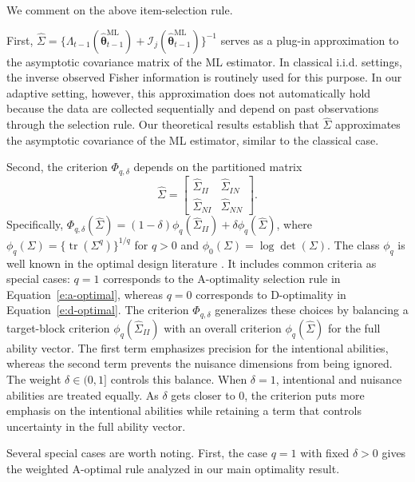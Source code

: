 \documentclass[12pt]{article}
\newcommand{\bftheta}{\boldsymbol{\theta}}
\begin{document}
We comment on the above item-selection rule.

First, \(\hat{\Sigma} =\big\{\Lambda_{t-1}(\hat{\bftheta}_{t-1}^{\mathrm{ML}})+\mathcal{I}_j(\hat{\bftheta}_{t-1}^{\mathrm{ML}})\big\}^{-1}\) serves as a plug-in approximation to the asymptotic covariance matrix of the ML estimator. In classical i.i.d. settings, the inverse observed Fisher information is routinely used for this purpose. In our adaptive setting, however, this approximation does not automatically hold because the data are collected sequentially and depend on past observations through the selection rule. Our theoretical results establish that \(\hat{\Sigma}\) approximates the asymptotic covariance of the ML estimator, similar to the classical case.

Second, the criterion \(\Phi_{q,\delta}\) depends on the partitioned matrix 
\begin{equation*}
\hat{\Sigma} =
\begin{bmatrix}
 \hat{\Sigma}_{II} & \hat{\Sigma}_{IN}
 \\ \hat{\Sigma}_{NI} & \hat{\Sigma}_{NN}
\end{bmatrix}.
\end{equation*}
Specifically, $\Phi_{q,\delta}(\hat{\Sigma}) = (1-\delta)\phi_q(\hat{\Sigma}_{II})+\delta\phi_q(\hat{\Sigma})$, where $\phi_q(\Sigma) = \{\operatorname{tr}(\Sigma^q)\}^{1/q}$ for $q>0$ and $\phi_0(\Sigma) = \log \operatorname{det}(\Sigma)$. The class $\phi_q$ is well known in the optimal design literature \cite{pukelsheim2006optimal}. It includes common criteria as special cases: $q=1$ corresponds to the A-optimality selection rule in Equation~\eqref{e:a-optimal}, whereas $q=0$ corresponds to D-optimality in Equation~\eqref{e:d-optimal}. The criterion $\Phi_{q,\delta}$ generalizes these choices by balancing a target-block criterion $\phi_q(\hat{\Sigma}_{II})$ with an overall criterion $\phi_q(\hat{\Sigma})$ for the full ability vector. The first term emphasizes precision for the intentional abilities, whereas the second term prevents the nuisance dimensions from being ignored. The weight $\delta \in (0,1]$ controls this balance. When $\delta = 1$, intentional and nuisance abilities are treated equally. As $\delta$ gets closer to $0$, the criterion puts more emphasis on the intentional abilities while retaining a term that controls uncertainty in the full ability vector.

Several special cases are worth noting. First, the case $q=1$ with fixed $\delta>0$ gives the weighted A-optimal rule analyzed in our main optimality result.
\end{document}
